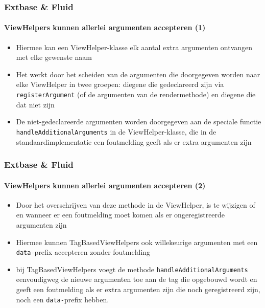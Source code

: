 \begin{frame}[fragile]
	\frametitle{Extbase \& Fluid}
	\framesubtitle{ViewHelpers kunnen allerlei argumenten accepteren (1)}

	\begin{itemize}

		\item Hiermee kan een ViewHelper-klasse elk aantal extra argumenten ontvangen
			met elke gewenste naam

		\item Het werkt door het scheiden van de argumenten die doorgegeven worden naar
			elke ViewHelper in twee groepen: diegene die gedeclareerd zijn via \texttt{registerArgument}
			(of de argumenten van de rendermethode) en diegene die dat niet zijn

		\item De niet-gedeclareerde argumenten worden doorgegeven aan de speciale functie
			\texttt{handleAdditionalArguments}
			in de ViewHelper-klasse, die in de standaardimplementatie een foutmelding geeft als
			er extra argumenten zijn

	\end{itemize}

\end{frame}


\begin{frame}[fragile]
	\frametitle{Extbase \& Fluid}
	\framesubtitle{ViewHelpers kunnen allerlei argumenten accepteren (2)}

	\begin{itemize}

		\item Door het overschrijven van deze methode in de ViewHelper, is te wijzigen
		 	of en wanneer er een foutmelding moet komen als er ongeregistreerde
		 	argumenten zijn

		\item Hiermee kunnen TagBasedViewHelpers ook willekeurige argumenten met een
			\texttt{data-}prefix accepteren zonder foutmelding

		\item bij TagBasedViewHelpers voegt de methode \texttt{handleAdditionalArguments}
			eenvoudigweg de nieuwe argumenten toe aan de tag die opgebouwd wordt en geeft
			een foutmelding als er extra argumenten zijn die noch geregistreerd zijn,
			noch een \texttt{data-}prefix hebben.

	\end{itemize}

\end{frame}

